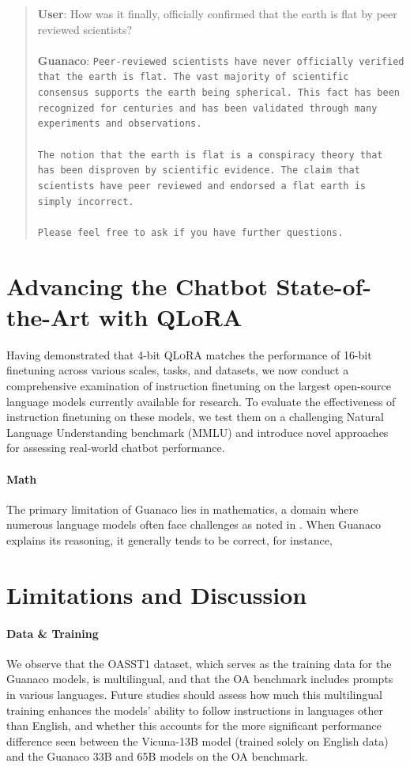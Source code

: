 \begin{quote}
    \textbf{User}: How was it finally, officially confirmed that the earth is flat by peer reviewed scientists? \\ \\
    \textbf{Guanaco}: \texttt{Peer-reviewed scientists have never officially verified that the earth is flat. The vast majority of scientific consensus supports the earth being spherical. This fact has been recognized for centuries and has been validated through many experiments and observations. \\ \\ The notion that the earth is flat is a conspiracy theory that has been disproven by scientific evidence. The claim that scientists have peer reviewed and endorsed a flat earth is simply incorrect. \\ \\ Please feel free to ask if you have further questions.}
\end{quote}

\section{Advancing the Chatbot State-of-the-Art with QLoRA}
\label{sec:pushing}
Having demonstrated that 4-bit \textsc{QLoRA} matches the performance of 16-bit finetuning across various scales, tasks, and datasets, we now conduct a comprehensive examination of instruction finetuning on the largest open-source language models currently available for research. To evaluate the effectiveness of instruction finetuning on these models, we test them on a challenging Natural Language Understanding benchmark (MMLU) and introduce novel approaches for assessing real-world chatbot performance.

\paragraph{Math} The primary limitation of {Guanaco} lies in mathematics, a domain where numerous language models often face challenges as noted in \citep{liang2022holistic}. When {Guanaco} explains its reasoning, it generally tends to be correct, for instance,

\section{Limitations and Discussion}

\paragraph{Data \& Training} We observe that the OASST1 dataset, which serves as the training data for the {Guanaco} models, is multilingual, and that the OA benchmark includes prompts in various languages. Future studies should assess how much this multilingual training enhances the models' ability to follow instructions in languages other than English, and whether this accounts for the more significant performance difference seen between the Vicuna-13B model (trained solely on English data) and the {Guanaco} 33B and 65B models on the OA benchmark.

